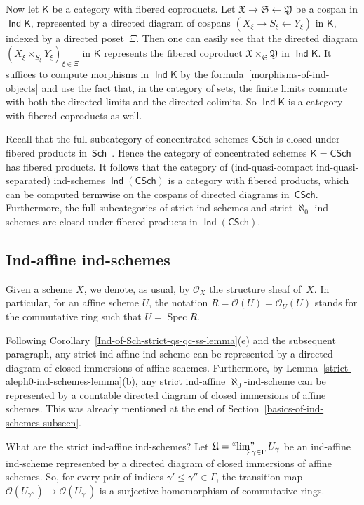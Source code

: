 \documentclass[12pt,a4paper]{amsart}
\newcommand{\+}{\protect\nobreakdash-}
\renewcommand{\:}{\colon}
\newcommand{\rarrow}{\longrightarrow}
\newcommand{\larrow}{\longleftarrow}
\DeclareMathOperator{\Spec}{Spec}
\DeclareMathOperator{\Ind}{\mathsf{Ind}}
\newcommand{\Sch}{\mathsf{Sch}}
\newcommand{\CSch}{\mathsf{CSch}}
\newcommand{\ilim}
 {\mathop{\text{\normalfont``$\varinjlim$''\!\!}}\nolimits}
\newcommand{\sK}{\mathsf K}
\newcommand{\cO}{\mathcal O}
\newcommand{\fX}{\mathfrak X}
\newcommand{\fY}{\mathfrak Y}
\newcommand{\fS}{\mathfrak S}
\newcommand{\fU}{\mathfrak U}
\theoremstyle{plain}
\theoremstyle{definition}
\begin{document}
 Now let $\sK$ be a category with fibered coproducts.
 Let $\fX\rarrow\fS\larrow\fY$ be a cospan in $\Ind\sK$, represented
by a directed diagram of cospans $(X_\xi\rightarrow S_\xi\leftarrow
Y_\xi)$ in $\sK$, indexed by a directed poset~$\Xi$.
 Then one can easily see that the directed diagram
$(X_\xi\times_{S_\xi}Y_\xi)_{\xi\in\Xi}$ in $\sK$ represents
the fibered coproduct $\fX\times_\fS\fY$ in $\Ind\sK$.
 It suffices to compute morphisms in $\Ind\sK$ by
the formula~\eqref{morphisms-of-ind-objects} and use the fact that,
in the category of sets, the finite limits commute with both
the directed limits and the directed colimits.
 So $\Ind\sK$ is a category with fibered coproducts as well.

 Recall that the full subcategory of concentrated schemes $\CSch$ is
closed under fibered products in~$\Sch$ \,\cite[Remark Tag~0816]{SP}.
 Hence the category of concentrated schemes $\sK=\CSch$ has fibered
products.
 It follows that the category of (ind-quasi-compact ind-quasi-separated)
ind-schemes $\Ind(\CSch)$ is a category with fibered products, which
can be computed termwise on the cospans of directed diagrams in~$\CSch$.
 Furthermore, the full subcategories of strict ind-schemes and strict
$\aleph_0$\+ind-schemes are closed under fibered products in
$\Ind(\CSch)$.

\subsection{Ind-affine ind-schemes}
 Given a scheme $X$, we denote, as usual, by $\cO_X$ the structure
sheaf of~$X$.
 In particular, for an affine scheme $U$, the notation $R=\cO(U)=
\cO_U(U)$ stands for the commutative ring such that $U=\Spec R$.

 Following Corollary~\ref{Ind-of-Sch-strict-qs-qc-ss-lemma}(e) and
the subsequent paragraph, any strict ind-affine ind-scheme can be
represented by a directed diagram of closed immersions of affine
schemes.
 Furthermore, by Lemma~\ref{strict-aleph0-ind-schemes-lemma}(b), any
strict ind-affine $\aleph_0$\+ind-scheme can be represented by
a countable directed diagram of closed immersions of affine schemes.
 This was already mentioned at the end of
Section~\ref{basics-of-ind-schemes-subsecn}.

 What are the strict ind-affine ind-schemes?
 Let $\fU=\ilim_{\gamma\in\Gamma}U_\gamma$ be an ind-affine ind-scheme
represented by a directed diagram of closed immersions of affine
schemes.
 So, for every pair of indices $\gamma'\le\gamma''\in\Gamma$,
the transition map $\cO(U_{\gamma''})\rarrow\cO(U_{\gamma'})$ is
a surjective homomorphism of commutative rings.
\end{document}
